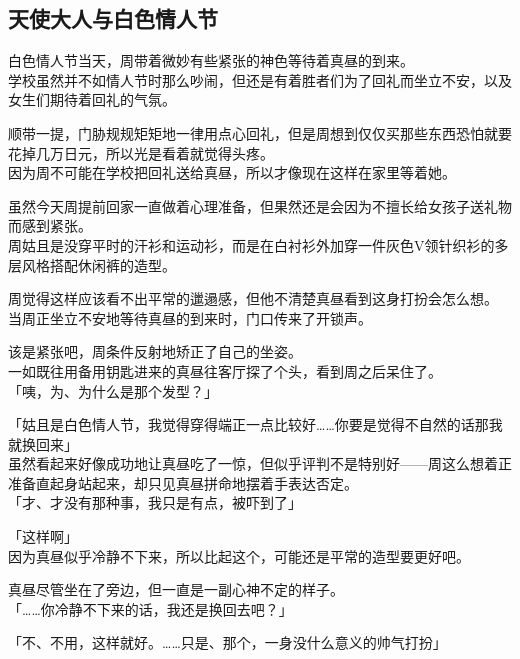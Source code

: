 \subsection{天使大人与白色情人节}

白色情人节当天，周带着微妙有些紧张的神色等待着真昼的到来。\\

学校虽然并不如情人节时那么吵闹，但还是有着胜者们为了回礼而坐立不安，以及女生们期待着回礼的气氛。

顺带一提，门胁规规矩矩地一律用点心回礼，但是周想到仅仅买那些东西恐怕就要花掉几万日元，所以光是看着就觉得头疼。\\

因为周不可能在学校把回礼送给真昼，所以才像现在这样在家里等着她。

虽然今天周提前回家一直做着心理准备，但果然还是会因为不擅长给女孩子送礼物而感到紧张。\\

周姑且是没穿平时的汗衫和运动衫，而是在白衬衫外加穿一件灰色V领针织衫的多层风格搭配休闲裤的造型。

周觉得这样应该看不出平常的邋遢感，但他不清楚真昼看到这身打扮会怎么想。\\

当周正坐立不安地等待真昼的到来时，门口传来了开锁声。

该是紧张吧，周条件反射地矫正了自己的坐姿。\\

一如既往用备用钥匙进来的真昼往客厅探了个头，看到周之后呆住了。\\

「咦，为、为什么是那个发型？」

「姑且是白色情人节，我觉得穿得端正一点比较好……你要是觉得不自然的话那我就换回来」\\

虽然看起来好像成功地让真昼吃了一惊，但似乎评判不是特别好——周这么想着正准备直起身站起来，却只见真昼拼命地摆着手表达否定。\\

「才、才没有那种事，我只是有点，被吓到了」

「这样啊」\\

因为真昼似乎冷静不下来，所以比起这个，可能还是平常的造型要更好吧。

真昼尽管坐在了旁边，但一直是一副心神不定的样子。\\

「……你冷静不下来的话，我还是换回去吧？」

「不、不用，这样就好。……只是、那个，一身没什么意义的帅气打扮」

